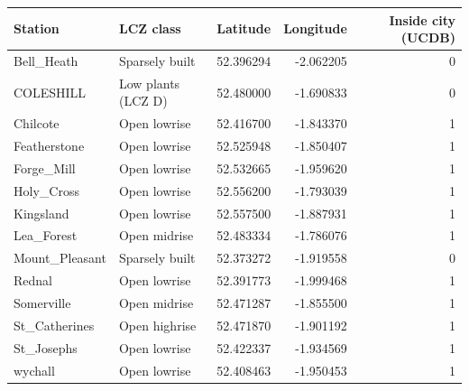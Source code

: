 \begin{tabular}{llrrr}
\toprule
Station & LCZ class & Latitude & Longitude & Inside city (UCDB) \\
\midrule
Bell_Heath & Sparsely built & 52.396294 & -2.062205 & 0 \\
COLESHILL & Low plants (LCZ D) & 52.480000 & -1.690833 & 0 \\
Chilcote & Open lowrise & 52.416700 & -1.843370 & 1 \\
Featherstone & Open lowrise & 52.525948 & -1.850407 & 1 \\
Forge_Mill & Open lowrise & 52.532665 & -1.959620 & 1 \\
Holy_Cross & Open lowrise & 52.556200 & -1.793039 & 1 \\
Kingsland & Open lowrise & 52.557500 & -1.887931 & 1 \\
Lea_Forest & Open midrise & 52.483334 & -1.786076 & 1 \\
Mount_Pleasant & Sparsely built & 52.373272 & -1.919558 & 0 \\
Rednal & Open lowrise & 52.391773 & -1.999468 & 1 \\
Somerville & Open midrise & 52.471287 & -1.855500 & 1 \\
St_Catherines & Open highrise & 52.471870 & -1.901192 & 1 \\
St_Josephs & Open lowrise & 52.422337 & -1.934569 & 1 \\
wychall & Open lowrise & 52.408463 & -1.950453 & 1 \\
\bottomrule
\end{tabular}
